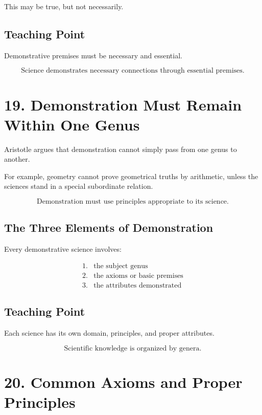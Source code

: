 \documentclass[12pt]{article}
\begin{document}
This may be true, but not necessarily.

\subsection*{Teaching Point}

Demonstrative premises must be necessary and essential.

\[
\boxed{
\text{Science demonstrates necessary connections through essential premises.}
}
\]

\section*{19. Demonstration Must Remain Within One Genus}

Aristotle argues that demonstration cannot simply pass from one genus to
another.

For example, geometry cannot prove geometrical truths by arithmetic, unless the
sciences stand in a special subordinate relation.

\[
\boxed{
\text{Demonstration must use principles appropriate to its science.}
}
\]

\subsection*{The Three Elements of Demonstration}

Every demonstrative science involves:

\[
\begin{array}{ll}
1. & \text{the subject genus} \\
2. & \text{the axioms or basic premises} \\
3. & \text{the attributes demonstrated}
\end{array}
\]

\subsection*{Teaching Point}

Each science has its own domain, principles, and proper attributes.

\[
\boxed{
\text{Scientific knowledge is organized by genera.}
}
\]

\section*{20. Common Axioms and Proper Principles}
\end{document}
